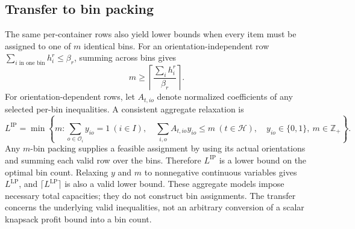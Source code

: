 \subsection{Transfer to bin packing}
\label{subsec:bin-packing}
The same per-container rows also yield lower bounds when every item
must be assigned to one of $m$ identical bins. For an orientation-independent
row $\sum_{i\text{ in one bin}}h_i^r\leq\beta_r$, summing across bins gives
\begin{equation}
 m\geq\left\lceil\frac{\sum_i h_i^r}{\beta_r}\right\rceil.
                                                               \label{eq:bp-simple}
\end{equation}
For orientation-dependent rows, let $A_{t,io}$ denote normalized
coefficients of any selected per-bin inequalities. A consistent
aggregate relaxation is
\begin{equation}
 L^{\mathrm{IP}}=\min\left\{m:
  \sum_{o\in\mathcal O_i}y_{io}=1\ (i\in I),\quad
  \sum_{i,o}A_{t,io}y_{io}\leq m\ (t\in\mathcal H),\quad
  y_{io}\in\{0,1\},\ m\in\mathbb Z_+\right\}.                 \label{eq:bp-model}
\end{equation}
Any $m$-bin packing supplies a feasible assignment by using its actual
orientations and summing each valid row over the bins. Therefore
$L^{\mathrm{IP}}$ is a lower bound on the optimal bin count. Relaxing
$y$ and $m$ to nonnegative continuous variables gives $L^{\mathrm{LP}}$,
and $\lceil L^{\mathrm{LP}}\rceil$ is also a valid lower bound. These
aggregate models impose necessary total capacities; they do not
construct bin assignments. The transfer concerns the underlying
valid inequalities, not an arbitrary conversion of a scalar knapsack
profit bound into a bin count.
